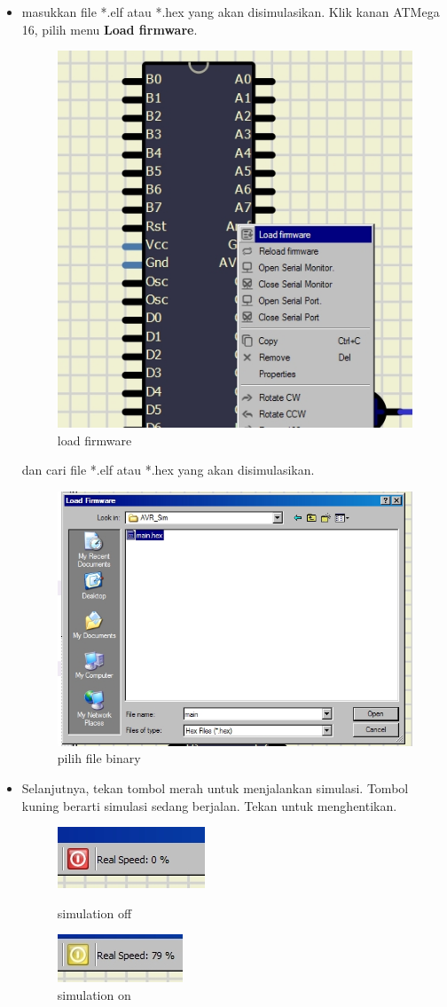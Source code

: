 \documentclass[12pt,]{article}
\begin{document}
\begin{itemize}
		\item masukkan file *.elf atau *.hex yang akan disimulasikan.
		Klik kanan ATMega 16, pilih menu \textbf{Load firmware}.
		
		\begin{figure}[H]
			\centering
			\includegraphics[width=0.5\linewidth]{images/tessim_2}
			\caption{load firmware}
		\end{figure}
		
		dan cari file *.elf atau *.hex yang akan disimulasikan.
		
		\begin{figure}[H]
			\centering
			\includegraphics[width=0.5\linewidth]{images/tessim_3}
			\caption{pilih file binary}
		\end{figure}
		
		\item Selanjutnya, tekan tombol merah untuk menjalankan simulasi.
		Tombol kuning berarti simulasi sedang berjalan. Tekan untuk menghentikan.
		
		\begin{figure}[H]
			\centering
			\includegraphics[width=0.25\linewidth]{images/tessim_off}
			\caption{simulation off}
			\includegraphics[width=0.25\linewidth]{images/tessim_on}
			\caption{simulation on}
		\end{figure}
	

\end{itemize}
\end{document}
